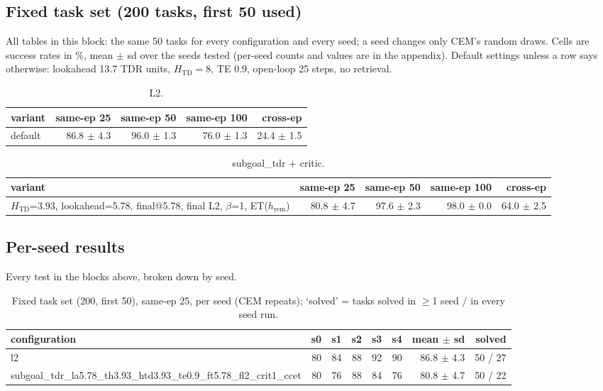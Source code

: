 \subsection*{Fixed task set (200 tasks, first 50 used)}
All tables in this block: the same 50 tasks for every configuration and every seed; a seed changes only CEM's random draws. Cells are success rates in \%, mean $\pm$ sd over the seeds tested (per-seed counts and values are in the appendix). Default settings unless a row says otherwise: lookahead 13.7 TDR units, $H_{\mathrm{TD}}=8$, TE 0.9, open-loop 25 steps, no retrieval.

\begin{table}[H]
\centering\small
\caption{L2.}
\label{tab:gas-mpc-l2-task200-n50}
\begin{tabular}{lrrrr}
\toprule
variant & same-ep 25 & same-ep 50 & same-ep 100 & cross-ep \\
\midrule
default & 86.8 $\pm$ 4.3 & 96.0 $\pm$ 1.3 & 76.0 $\pm$ 1.3 & 24.4 $\pm$ 1.5 \\
\bottomrule
\end{tabular}
\end{table}

\begin{table}[H]
\centering\small
\caption{subgoal\_tdr + critic.}
\label{tab:gas-mpc-subgoal_tdr-crit-task200-n50}
\begin{tabular}{lrrrr}
\toprule
variant & same-ep 25 & same-ep 50 & same-ep 100 & cross-ep \\
\midrule
$H_{\mathrm{TD}}$=3.93, lookahead=5.78, final@5.78, final L2, $\beta$=1, ET($h_{\mathrm{rem}}$) & 80.8 $\pm$ 4.7 & 97.6 $\pm$ 2.3 & 98.0 $\pm$ 0.0 & 64.0 $\pm$ 2.5 \\
\bottomrule
\end{tabular}
\end{table}

\clearpage
\subsection*{Per-seed results}
Every test in the blocks above, broken down by seed.

\begin{table}[H]
\centering\small
\caption{Fixed task set (200, first 50), same-ep 25, per seed (CEM repeats); `solved' = tasks solved in $\ge$1 seed / in every seed run.}
\label{tab:gas-mpc-pooled-same25-task200-n50}
\begin{tabular}{lrrrrrrr}
\toprule
configuration & s0 & s1 & s2 & s3 & s4 & mean $\pm$ sd & solved \\
\midrule
l2 & 80 & 84 & 88 & 92 & 90 & 86.8 $\pm$ 4.3 & 50 / 27 \\
subgoal\_tdr\_la5.78\_th3.93\_htd3.93\_te0.9\_ft5.78\_fl2\_crit1\_ccet & 80 & 76 & 88 & 84 & 76 & 80.8 $\pm$ 4.7 & 50 / 22 \\
\bottomrule
\end{tabular}
\end{table}

